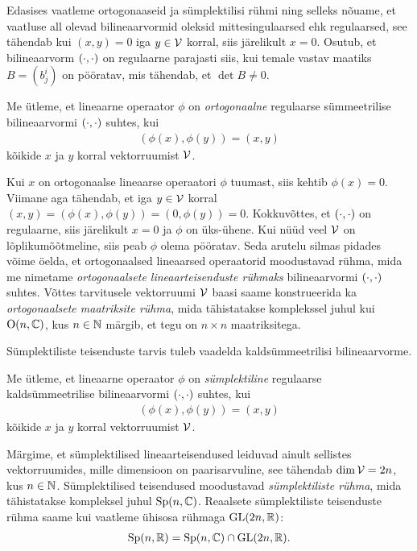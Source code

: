 Edasises vaatleme ortogonaaseid ja sümplektilisi rühmi ning selleks
nõuame, et vaatluse all olevad bilineaarvormid oleksid mittesingulaarsed
ehk regulaarsed, see tähendab kui $(x, y) = 0$ iga $y \in \mathcal{V}$ korral, siis
järelikult $x = 0$. Osutub, et bilineaarvorm $\left( \cdot, \cdot \right)$ on regulaarne parajasti
siis, kui temale vastav maatiks $B = (b^i_j)$ on pööratav, mis tähendab,
et $\det B \neq 0$.

\begin{dfn}
    Me ütleme, et lineaarne operaator $\phi$ on \emph{ortogonaalne}
    regulaarse sümmeetrilise bilineaarvormi $\left( \cdot, \cdot \right)$ suhtes, kui
    \begin{align*}
        (\phi(x), \phi(y)) = (x, y)
    \end{align*}
    kõikide $x$ ja $y$ korral vektorruumist $\mathcal{V}$.
\end{dfn}

Kui $x$ on ortogonaalse lineaarse operaatori $\phi$ tuumast, siis
kehtib $\phi(x) = 0$. Viimane aga tähendab, et iga $y \in \mathcal{V}$ korral
$(x, y) = (\phi(x), \phi(y)) = (0, \phi(y)) = 0$. Kokkuvõttes,
et $\left( \cdot, \cdot \right)$ on regulaarne, siis järelikult $x = 0$ ja $\phi$ on üks-ühene.
Kui nüüd veel $\mathcal{V}$ on lõplikumõõtmeline, siis peab $\phi$ olema pööratav.
Seda arutelu silmas pidades võime öelda, et ortogonaalsed lineaarsed
operaatorid moodustavad rühma, mida me nimetame \emph{ortogonaalsete
lineaarteisenduste rühmaks} bilineaarvormi $\left( \cdot, \cdot \right)$ suhtes.
Võttes tarvitusele vektorruumi $\mathcal{V}$ baasi saame konstrueerida ka
\emph{ortogonaalsete maatriksite rühma}, mida tähistatakse komplekssel
juhul kui $\operatorname{O}(n, \mathbb{C})$, kus $n \in \mathbb{N}$ märgib, et tegu on $n \times n$
maatriksitega.

Sümplektiliste teisenduste tarvis tuleb vaadelda kaldsümmeetrilisi
bilineaarvorme.

\begin{dfn}
    Me ütleme, et lineaarne operaator $\phi$ on \emph{sümplektiline}
    regulaarse kaldsümmeetrilise bilineaarvormi $\left( \cdot, \cdot \right)$ suhtes, kui
    \begin{align*}
        (\phi(x), \phi(y)) = (x, y)
    \end{align*}
    kõikide $x$ ja $y$ korral vektorruumist $\mathcal{V}$.
\end{dfn}

Märgime, et sümplektilised lineaarteisendused leiduvad ainult sellistes
vektorruumides, mille dimensioon on paarisarvuline, see tähendab
$\dim \mathcal{V} = 2n$, kus $n \in \mathbb{N}$. Sümplektilised teisendused moodustavad
\emph{sümplektiliste rühma}, mida tähistatakse kompleksel juhul
$\operatorname{Sp}(n, \mathbb{C})$. Reaalsete sümplektiliste
teisenduste rühma saame kui vaatleme ühisosa rühmaga $\operatorname{GL}(2n, \mathbb{R})$:
\begin{align*}
    \operatorname{Sp}(n, \mathbb{R}) = \operatorname{Sp}(n, \mathbb{C}) \cap \operatorname{GL}(2n, \mathbb{R}).
\end{align*}


